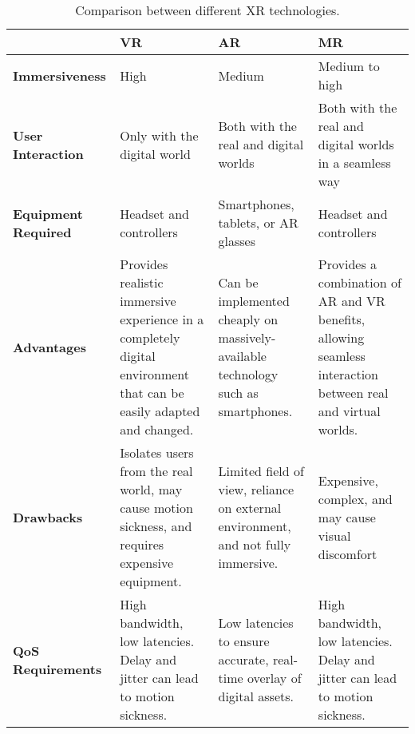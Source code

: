 \begin{table}[]
    \centering
    \caption{Comparison between different \acs{XR} technologies.}
    \label{tab:xrcomparison}
    \tiny
    \renewcommand{\arraystretch}{1.5}
    \begin{tabularx}{\textwidth}{@{}lYYY@{}}
        \toprule
        &
        \textbf{\acl{VR}} &
        \textbf{\acl{AR}} &
        \textbf{\acl{MR}} \\ \midrule
        \textbf{Immersiveness} &
        High &
        Medium &
        Medium to high \\
        \textbf{User Interaction} &
        Only with the digital world &
        Both with the real and digital worlds &
        Both with the real and digital worlds in a seamless way \\
        \textbf{Equipment Required} &
        Headset and controllers &
        Smartphones, tablets, or \acs{AR} glasses &
        Headset and controllers \\
        \textbf{Advantages} &
        Provides realistic immersive experience in a completely digital environment that can be easily adapted and changed. &
        Can be implemented cheaply on massively-available technology such as smartphones. &
        Provides a combination of AR and VR benefits, allowing seamless interaction between real and virtual worlds. \\
        \textbf{Drawbacks} &
        Isolates users from the real world, may cause motion sickness, and requires expensive equipment. &
        Limited field of view, reliance on external environment, and not fully immersive. &
        Expensive, complex, and may cause visual discomfort \\
        \textbf{\acs{QoS} Requirements} &
        High bandwidth, low latencies.
        Delay and jitter can lead to motion sickness. &
        Low latencies to ensure accurate, real-time overlay of digital assets. &
        High bandwidth, low latencies.
        Delay and jitter can lead to motion sickness. \\
        \bottomrule
    \end{tabularx}
\end{table}
